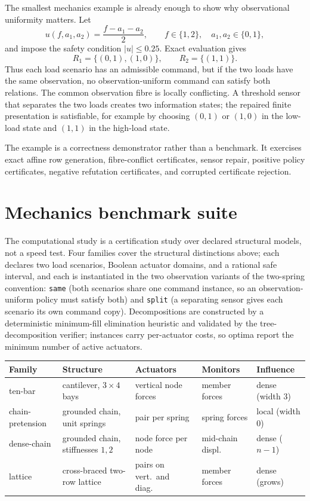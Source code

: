 \documentclass[11pt]{article}
\theoremstyle{plain}
\theoremstyle{definition}
\theoremstyle{remark}
\begin{document}
The smallest mechanics example is already enough to show why observational
uniformity matters.  Let
\[
  u(f,a_1,a_2)=\frac{f-a_1-a_2}{2},
  \qquad f\in\{1,2\},\quad a_1,a_2\in\{0,1\},
\]
and impose the safety condition \(|u|\le 0.25\).  Exact evaluation gives
\[
  R_1=\{(0,1),(1,0)\},
  \qquad
  R_2=\{(1,1)\}.
\]
Thus each load scenario has an admissible command, but if the two loads have the
same observation, no observation-uniform command can satisfy both relations.
The common observation fibre is locally conflicting.  A threshold sensor that
separates the two loads creates two information states; the repaired finite
presentation is satisfiable, for example by choosing \((0,1)\) or \((1,0)\) in
the low-load state and \((1,1)\) in the high-load state.

The example is a correctness demonstrator rather than a benchmark.  It exercises
exact affine row generation, fibre-conflict certificates, sensor repair,
positive policy certificates, negative refutation certificates, and corrupted
certificate rejection.

\section{Mechanics benchmark suite}
\label{sec:mechanics-benchmarks}

The computational study is a certification study over declared structural
models, not a speed test.  Four families cover the structural distinctions
above; each declares two load scenarios, Boolean actuator domains, and a
rational safe interval, and each is instantiated in the two observation
variants of the two-spring convention: \texttt{same} (both scenarios share
one command instance, so an observation-uniform policy must satisfy both) and
\texttt{split} (a separating sensor gives each scenario its own command
copy).  Decompositions are constructed by a deterministic minimum-fill
elimination heuristic and validated by the tree-decomposition verifier;
instances carry per-actuator costs, so optima report the minimum number of
active actuators.

\begin{center}
\footnotesize
\begin{tabular}{@{}lllll@{}}
\toprule
Family & Structure & Actuators & Monitors & Influence\\
\midrule
ten-bar & cantilever, \(3\times4\) bays & vertical node forces & member forces & dense (width 3)\\
chain-pretension & grounded chain, unit springs & pair per spring & spring forces & local (width 0)\\
dense-chain & grounded chain, stiffnesses \(1,2\) & node force per node & mid-chain displ.\ & dense (\(n-1\))\\
lattice & cross-braced two-row lattice & pairs on vert.\ and diag.\ & member forces & dense (grows)\\
\bottomrule
\end{tabular}
\label{tab:mechanics-families}
\end{center}
\end{document}

